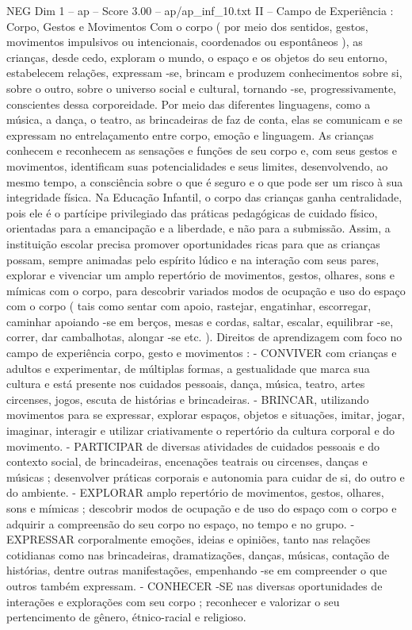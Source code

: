 \begin{textsample}{NEG Dim 1 – ap – Score 3.00 – ap/ap\_inf\_10.txt}  \label{ex:f1_neg_124}
II – Campo de Experiência : Corpo, Gestos e Movimentos Com o corpo ( por meio dos sentidos, gestos, movimentos impulsivos ou intencionais, coordenados ou espontâneos ), as crianças, desde cedo, exploram o mundo, o espaço e os objetos do seu entorno, estabelecem relações, expressam -se, brincam e produzem conhecimentos sobre si, sobre o outro, sobre o universo social e cultural, tornando -se, progressivamente, conscientes dessa corporeidade.
Por meio das diferentes linguagens, como a música, a dança, o teatro, as brincadeiras de faz de conta, elas se comunicam e se expressam no entrelaçamento entre corpo, emoção e linguagem.
As crianças conhecem e reconhecem as sensações e funções de seu corpo e, com seus gestos e movimentos, identificam suas potencialidades e seus limites, desenvolvendo, ao mesmo tempo, a consciência sobre o que é seguro e o que pode ser um risco à sua integridade física.
Na Educação Infantil, o corpo das crianças ganha centralidade, pois ele é o partícipe privilegiado das práticas pedagógicas de cuidado físico, orientadas para a emancipação e a liberdade, e não para a submissão.
Assim, a instituição escolar precisa promover oportunidades ricas para que as crianças possam, sempre animadas pelo espírito lúdico e na interação com seus pares, explorar e vivenciar um amplo repertório de movimentos, gestos, olhares, sons e mímicas com o corpo, para descobrir variados modos de ocupação e uso do espaço com o corpo ( tais como sentar com apoio, rastejar, engatinhar, escorregar, caminhar apoiando -se em berços, mesas e cordas, saltar, escalar, equilibrar -se, correr, dar cambalhotas, alongar -se etc. ).
Direitos de aprendizagem com foco no campo de experiência corpo, gesto e movimentos : - CONVIVER com crianças e adultos e experimentar, de múltiplas formas, a gestualidade que marca sua cultura e está presente nos cuidados pessoais, dança, música, teatro, artes circenses, jogos, escuta de histórias e brincadeiras. - BRINCAR, utilizando movimentos para se expressar, explorar espaços, objetos e situações, imitar, jogar, imaginar, interagir e utilizar criativamente o repertório da cultura corporal e do movimento. - PARTICIPAR de diversas atividades de cuidados pessoais e do contexto social, de brincadeiras, encenações teatrais ou circenses, danças e músicas ; desenvolver práticas corporais e autonomia para cuidar de si, do outro e do ambiente. - EXPLORAR amplo repertório de movimentos, gestos, olhares, sons e mímicas ; descobrir modos de ocupação e de uso do espaço com o corpo e adquirir a compreensão do seu corpo no espaço, no tempo e no grupo. - EXPRESSAR corporalmente emoções, ideias e opiniões, tanto nas relações cotidianas como nas brincadeiras, dramatizações, danças, músicas, contação de histórias, dentre outras manifestações, empenhando -se em compreender o que outros também expressam. - CONHECER -SE nas diversas oportunidades de interações e explorações com seu corpo ; reconhecer e valorizar o seu pertencimento de gênero, étnico-racial e religioso.

\end{textsample}
